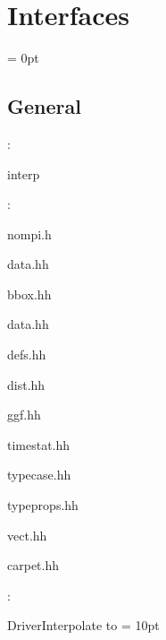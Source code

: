 
\section{Interfaces} 


\parskip = 0pt

\vspace{3mm} \subsection*{General}

: 

interp
\vspace{2mm}

\vspace{5mm}

: 

nompi.h

data.hh

bbox.hh

data.hh

defs.hh

dist.hh

ggf.hh

timestat.hh

typecase.hh

typeprops.hh

vect.hh

carpet.hh
\vspace{2mm}

: 



DriverInterpolate to 
\vspace{2mm}\parskip = 10pt 
